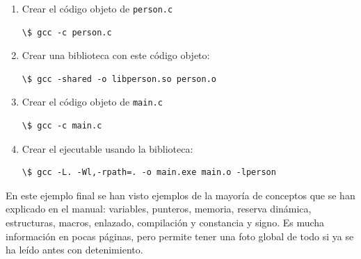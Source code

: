 \documentclass[a4paper]{article}
\begin{document}
\noindent
\begin{minipage}[H]{\linewidth}
\begin{enumerate}
\item Crear el código objeto de \verb!person.c!

\noindent
\begin{minipage}[H]{\linewidth}
\mbox{}
\begin{lstlisting}[style=terminalStyle]
\$ gcc -c person.c
\end{lstlisting}
\end{minipage}
\item Crear una biblioteca con este código objeto:

\noindent
\begin{minipage}[H]{\linewidth}
\mbox{}
\begin{lstlisting}[style=terminalStyle]
\$ gcc -shared -o libperson.so person.o
\end{lstlisting}
\end{minipage}
\item Crear el código objeto de \verb!main.c!

\noindent
\begin{minipage}[H]{\linewidth}
\mbox{}
\begin{lstlisting}[style=terminalStyle]
\$ gcc -c main.c
\end{lstlisting}
\end{minipage}
\item Crear el ejecutable usando la biblioteca:

\noindent
\begin{minipage}[H]{\linewidth}
\mbox{}
\begin{lstlisting}[style=terminalStyle]
\$ gcc -L. -Wl,-rpath=. -o main.exe main.o -lperson
\end{lstlisting}
\end{minipage}
\end{enumerate}
\end{minipage}

En este ejemplo final se han visto ejemplos de la mayoría de conceptos que
se han explicado en el manual: variables, punteros, memoria, reserva dinámica,
estructuras, macros, enlazado, compilación y constancia y signo. Es mucha
información en pocas páginas, pero permite tener una foto global de todo
si ya se ha leído antes con detenimiento.
\end{document}
